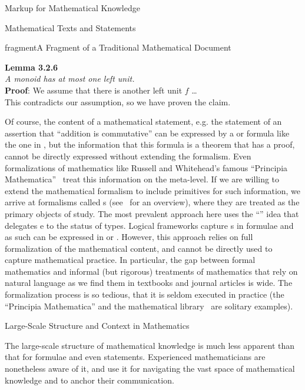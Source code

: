 \begin{tchapter}[id=math-markup]{Markup for Mathematical Knowledge}
\begin{tsection}[id=meta-math]{Mathematical Texts and Statements}
\begin{myfig}{fragment}{A Fragment of a Traditional Mathematical Document}
{\begin{minipage}{10cm}
    {\bf Lemma 3.2.6}\\
    {\emph{A monoid has at most one left unit.}}\\
    {\bf Proof}: We assume that there is another left unit $f$ \ldots\\
    This contradicts our assumption, so we have proven the claim.\hfill\kasten
  \end{minipage}}
\end{myfig}
Of course, the content of a mathematical statement, e.g. the statement of an assertion
that ``addition is commutative'' can be expressed by a {\cmathml} or {\openmath} formula
like the one in {}, but the information that this formula is a theorem
that has a proof, cannot be directly expressed without extending the formalism. Even
formalizations of mathematics like Russell and Whitehead's famous ``Principia
Mathematica''~\cite{WhiRus:pm10} treat this information on the meta-level. If we are
willing to extend the mathematical formalism to include primitives for such information,
we arrive at formalisms called {s} (see~\cite{Pfenning:lf01}
for an overview), where they are treated as the primary objects of study. The most
prevalent approach here uses the ``{}'' idea that delegates
{e} to the status of types. Logical frameworks capture
{s} in formulae and as such can be expressed in
{\cmathml} or {\openmath}.  However, this approach relies on full formalization of the
mathematical content, and cannot be directly used to capture mathematical practice. In
particular, the gap between formal mathematics and informal (but rigorous) treatments of
mathematics that rely on natural language as we find them in textbooks and journal
articles is wide.  The formalization process is so tedious, that it is seldom executed in
practice (the ``Principia Mathematica'' and the {\mizar} mathematical
library~\cite{MizarKB} are solitary examples).
\end{tsection}

\begin{tsection}[id=meta-theories]{Large-Scale Structure and Context in Mathematics}

  The large-scale structure of mathematical knowledge is much less apparent than that for
  formulae and even statements. Experienced mathematicians are nonetheless aware of it,
  and use it for navigating the vast space of mathematical knowledge and to anchor their
  communication. 


\end{tsection}
\end{tchapter}
